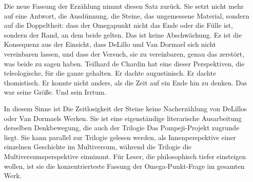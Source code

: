\documentclass[
  ngerman,
]{article}
\begin{document}
Die neue Fassung der Erzählung nimmt diesen Satz zurück. Sie setzt nicht
mehr auf eine Antwort, die Ausdünnung, die Steine, das ungemessene
Material, sondern auf die Doppeltheit: dass der Omegapunkt nicht das
Ende oder die Fülle ist, sondern der Rand, an dem beide gelten. Das ist
keine Abschwächung. Es ist die Konsequenz aus der Einsicht, dass DeLillo
und Van Dormael sich nicht vereinbaren lassen, und dass der Versuch, sie
zu vereinbaren, genau das zerstört, was beide zu sagen haben. Teilhard
de Chardin hat eine dieser Perspektiven, die teleologische, für die
ganze gehalten. Er dachte augustinisch. Er dachte thomistisch. Er konnte
nicht anders, als die Zeit auf ein Ende hin zu denken. Das war seine
Größe. Und sein Irrtum.

In diesem Sinne ist Die Zeitlosigkeit der Steine keine Nacherzählung von
DeLillos oder Van Dormaels Werken. Sie ist eine eigenständige
literarische Ausarbeitung derselben Denkbewegung, die auch der Trilogie
Das Pompeji-Projekt zugrunde liegt. Sie kann parallel zur Trilogie
gelesen werden, als Innenperspektive einer einzelnen Geschichte im
Multiversum, während die Trilogie die Multiversumsperspektive einnimmt.
Für Leser, die philosophisch tiefer einsteigen wollen, ist sie die
konzentrierteste Fassung der Omega-Punkt-Frage im gesamten Werk.
\end{document}
